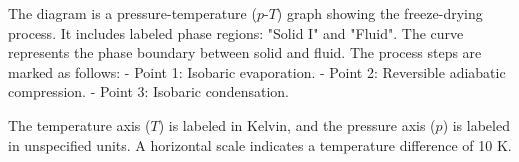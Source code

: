 The diagram is a pressure-temperature (\( p \)-\( T \)) graph showing the freeze-drying process. It includes labeled phase regions: "Solid I" and "Fluid". The curve represents the phase boundary between solid and fluid. The process steps are marked as follows:  
- Point 1: Isobaric evaporation.  
- Point 2: Reversible adiabatic compression.  
- Point 3: Isobaric condensation.  

The temperature axis (\( T \)) is labeled in Kelvin, and the pressure axis (\( p \)) is labeled in unspecified units. A horizontal scale indicates a temperature difference of 10 K.